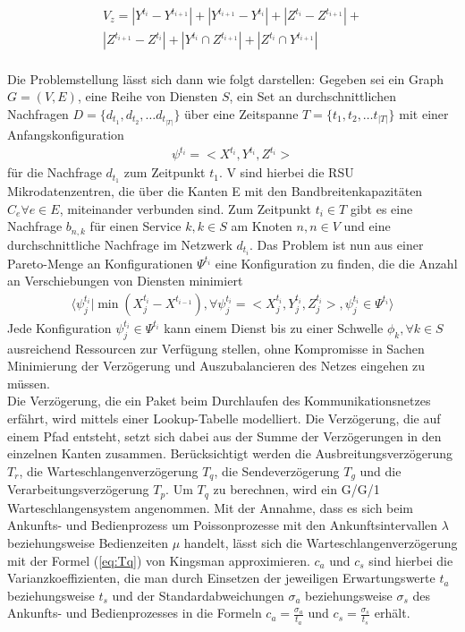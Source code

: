\documentclass[conference]{IEEEtran}
\begin{document}
\begin{equation}
\begin{split}
 V_z = |Y^{t_i}-Y^{t_{i+1}}|+|Y^{t_{i+1}}-Y^{t_{i}}|+|Z^{t_i}-Z^{t_{i+1}}|+ \\|Z^{t_{i+1}}-Z^{t_{i}}|+|Y^{t_i} \cap Z^{t_{i+1}}|+|Z^{t_{i}} \cap Y^{t_{i+1}}|
 \end{split}
\end{equation}
\\
Die Problemstellung lässt sich dann wie folgt darstellen: Gegeben sei ein Graph \(G=(V,E)\), eine Reihe von Diensten \(S\), ein Set an durchschnittlichen Nachfragen \(D=\{d_{t_1},d_{t_2},…d_{t_{|T|}}\}\) über eine Zeitspanne \(T=\{t_1,t_2,… t_{|T|}\}\) mit einer Anfangskonfiguration \begin{align*} \psi^{t_i}=<X^{t_i},Y^{t_i},Z^{t_i}> \end{align*} für die Nachfrage \(d_{t_1}\)
zum Zeitpunkt \(t_1\). V sind hierbei die RSU Mikrodatenzentren, die über die Kanten E mit
den Bandbreitenkapazitäten \(C_e \forall e \in E\), miteinander verbunden sind. Zum
Zeitpunkt \(t_i \in T\) gibt es eine Nachfrage \(b_{n,k}\) für einen Service \(k, k \in S\) am Knoten \(n, n\in V\) und eine durchschnittliche Nachfrage im Netzwerk \(d_{t_i}\). Das Problem ist nun aus einer Pareto-Menge an Konfigurationen \(\Psi^{t_i}\) eine Konfiguration zu finden, die die Anzahl an Verschiebungen von Diensten minimiert 
\begin{align*}
\langle \psi_{j}^{t_i}|\min(X_{j}^{t_i}-X^{t_{i-1}}),\forall \psi_{j}^{t_i}=<X_{j}^{t_i},Y_{j}^{t_i},Z_{j}^{t_i}>, \psi_{j}^{t_i} \in \Psi^{t_i}  \rangle
\end{align*}
Jede Konfiguration \(\psi_{j}^{t_i} \in \Psi^{t_i}\) kann einem Dienst bis zu einer Schwelle \(\phi_k, \forall k \in S\) ausreichend Ressourcen zur Verfügung stellen, ohne Kompromisse in Sachen Minimierung der Verzögerung und Auszubalancieren des Netzes eingehen zu müssen.\\
Die Verzögerung, die ein Paket beim Durchlaufen des Kommunikationsnetzes erfährt, wird mittels einer Lookup-Tabelle modelliert. Die Verzögerung, die auf einem Pfad entsteht, setzt sich dabei aus der Summe der Verzögerungen in den einzelnen Kanten zusammen. Berücksichtigt werden die Ausbreitungsverzögerung \(T_r\), die Warteschlangenverzögerung \(T_q\), die Sendeverzögerung \(T_g\) und die Verarbeitungsverzögerung \(T_p\). Um \(T_q\) zu berechnen, wird ein G/G/1 Warteschlangensystem angenommen. Mit der Annahme, dass es sich beim Ankunfts- und Bedienprozess um Poissonprozesse mit den Ankunftsintervallen \(\lambda\) beziehungsweise Bedienzeiten \(\mu\) handelt, lässt sich die Warteschlangenverzögerung mit der Formel (\ref{eq:Tq}) von Kingsman \cite{IEEEhowto:king} approximieren. \(c_a\) und \(c_s\) sind hierbei die Varianzkoeffizienten, die man durch Einsetzen der jeweiligen Erwartungswerte \(t_a\) beziehungsweise \(t_s\) und der Standardabweichungen \(\sigma_a\) beziehungsweise \(\sigma_s\) des Ankunfts- und Bedienprozesses in die Formeln \(c_a=\frac{\sigma_a}{t_a}\) und \(c_s=\frac{\sigma_s}{t_s}\) erhält.
\end{document}
